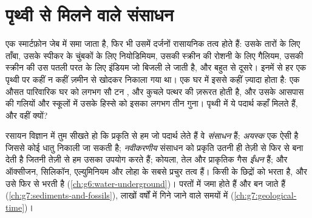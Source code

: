 \chapter{पृथ्वी से मिलने वाले संसाधन}\label{ch:g9:earth-resources}

एक स्मार्टफ़ोन जेब में समा जाता है, फिर भी उसमें दर्जनों रासायनिक तत्व होते हैं: उसके तारों
के लिए ताँबा, उसके स्पीकर के चुंबकों के लिए नियोडिमियम, उसकी स्क्रीन की रोशनी के लिए गैलियम,
उसकी स्क्रीन की उस पतली परत के लिए इंडियम जो बिजली ले जाती है, और बहुत से दूसरे। इनमें से
हर एक पृथ्वी पर कहीं न कहीं ज़मीन से खोदकर निकाला गया था। एक घर में इससे कहीं ज़्यादा होता
है: एक औसत पारिवारिक घर को लगभग सौ टन ,  और कुचले पत्थर की ज़रूरत होती है, और
उसके आसपास की गलियों और स्कूलों में उसके हिस्से को इसका लगभग तीन गुना। पृथ्वी में ये पदार्थ
कहाँ मिलते हैं, और वहीं क्यों?

\begin{recall}
रसायन विज्ञान में तुम सीखते हो कि प्रकृति से हम जो पदार्थ लेते हैं वे \emph{संसाधन} हैं;
\emph{अयस्क} एक ऐसी  है जिससे कोई धातु निकाली जा सकती है; \emph{नवीकरणीय}
संसाधन को प्रकृति उतनी ही तेज़ी से फिर से बना देती है जितनी तेज़ी से हम उसका उपयोग करते हैं;
कोयला, तेल और प्राकृतिक गैस \emph{ ईंधन} हैं; और ऑक्सीजन, सिलिकॉन, एल्युमिनियम
और लोहा  के सबसे प्रचुर तत्व हैं।  किसी  के छिद्रों को भरता है, और 
उसे फिर से भरती है (\cref{ch:g6:water-underground})।  परतों में जमा होते हैं और
 बन जाते हैं (\cref{ch:g7:sediments-and-fossils}), लाखों वर्षों में
गिने जाने वाले समयों में (\cref{ch:g7:geological-time})।
\end{recall}

